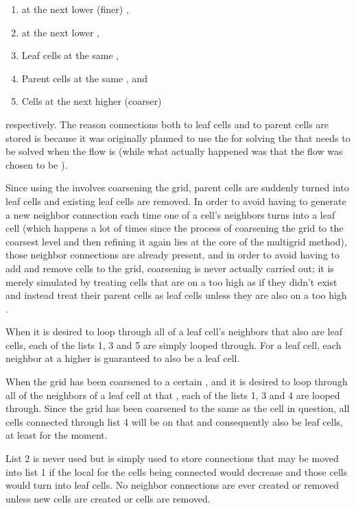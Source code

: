 \begin{enumerate}
    \item {} at the next lower (finer) \LOD,
    \item {} at the next lower \LOD,
    \item Leaf cells at the same \LOD,
    \item Parent cells at the same \LOD, and
    \item Cells at the next higher (coarser) \LOD
\end{enumerate}

respectively. The reason connections both to leaf cells and to parent cells are stored is because it was originally planned to use the  for solving the  that needs to be solved when the flow is  (while what actually happened was that the flow was chosen to be ).

Since using the  involves coarsening the grid, parent cells are suddenly turned into leaf cells and existing leaf cells are removed. In order to avoid having to generate a new neighbor connection each time one of a cell's neighbors turns into a leaf cell (which happens a lot of times since the process of coarsening the grid to the coarsest level and then refining it again lies at the core of the multigrid method), those neighbor connections are already present, and in order to avoid having to add and remove cells to the grid, coarsening is never actually carried out; it is merely simulated by treating cells that are on a too high \LOD as if they didn't exist and instead treat their parent cells as leaf cells unless they are also on a too high \LOD.

When it is desired to loop through all of a leaf cell's neighbors that also are leaf cells, each of the lists 1, 3 and 5 are simply looped through. For a leaf cell, each neighbor at a higher \LOD is guaranteed to also be a leaf cell.

When the grid has been coarsened to a certain \LOD, and it is desired to loop through all of the neighbors of a leaf cell at that \LOD, each of the lists 1, 3 and 4 are looped through. Since the grid has been coarsened to the same \LOD as the cell in question, all cells connected through list 4 will be on that \LOD and consequently also be leaf cells, at least for the moment.

List 2 is never used but is simply used to store connections that may be moved into list 1 if the local \LOD for the cells being connected would decrease and those cells would turn into leaf cells. No neighbor connections are ever created or removed unless new cells are created or cells are removed.

